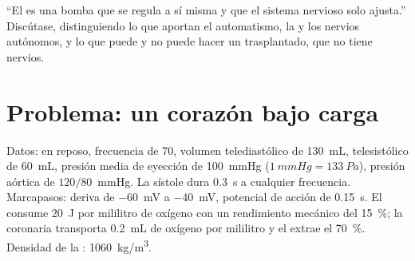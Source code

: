 \begin{exercise}[$\star\star\star$]\label{exo:b2:heart:12}
``El  es una bomba que se regula a sí misma y que el sistema
nervioso solo ajusta.'' Discútase, distinguiendo lo que aportan el
automatismo, la  y los nervios autónomos, y lo que
puede y no puede hacer un  trasplantado, que no tiene nervios.
\end{exercise}

\section{Problema: un corazón bajo carga}

\begin{problem}
\label{pb:b2:heart:1}
Datos: en reposo, frecuencia de 70, volumen telediastólico de
\qty{130}{mL}, telesistólico de \qty{60}{mL}, presión media de eyección de
\qty{100}{mmHg} ($\qty{1}{mmHg} = \qty{133}{Pa}$), presión aórtica de
$120/80$~mmHg. La sístole dura \qty{0.3}{s} a cualquier frecuencia.
Marcapasos: deriva de \qty{-60}{mV} a \qty{-40}{mV}, potencial de acción de
\qty{0.15}{s}. El  consume \qty{20}{J} por mililitro de oxígeno con
un rendimiento mecánico del \qty{15}{\%}; la  coronaria transporta
\qty{0.2}{mL} de oxígeno por mililitro y el  extrae el \qty{70}{\%}.
Densidad de la : \qty{1060}{kg/m^3}.


\end{problem}
